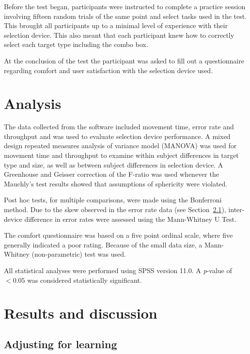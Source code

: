 \documentclass{elsart}
\begin{document}
Before the test began, participants were instructed to complete a
practice session involving fifteen random trials of the same point and
select tasks used in the test. This brought all participants up to a
minimal level of experience with their selection device. This also meant
that each participant knew how to correctly select each target type
including the combo box.

At the conclusion of the test the participant was asked to fill out a
questionnaire regarding comfort and user satisfaction with the selection
device used.


\section{Analysis}
\label{sec-analysis}

The data collected from the software included movement time, error rate
and throughput and was used to evaluate selection device performance. A
mixed design repeated measures analysis of variance model (MANOVA) was
used for movement time and throughput to examine within subject
differences in target type and size, as well as between subject
differences in selection device. A Greenhouse and Geisser correction of
the F-ratio was used whenever the Mauchly's test results showed that
assumptions of sphericity were violated.

Post hoc tests, for multiple comparisons, were made using the Bonferroni
method. Due to the skew observed in the error rate data (see
Section~\ref{sec-results-learning}), inter-device difference in error
rates were assessed using the Mann-Whitney U Test.

The comfort questionnaire was based on a five point ordinal scale, where
five generally indicated a poor rating. Because of the small data size, a
Mann-Whitney (non-parametric) test was used.

All statistical analyses were performed using SPSS version 11.0. A
\emph{p}-value of \(< 0.05\) was considered statistically significant.


\section{Results and discussion}
\label{sec-results}


\subsection{Adjusting for learning}
\label{sec-results-learning}
\end{document}
